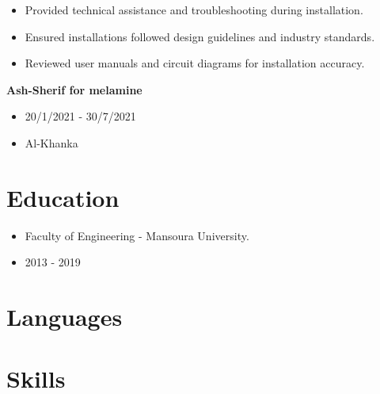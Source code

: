 \documentclass[9pt]{extarticle}
\begin{document}
\begin{paracol}{2}
\begin{expbox}[title = {\bfseries Testing \& Commissioning Engineer}]
\begin{itemize}[nosep,align = left, leftmargin = !, labelwidth = ]
                            \item Provided technical assistance and troubleshooting during installation.
                            \item Ensured installations followed design guidelines and industry standards.
                            \item Reviewed user manuals and circuit diagrams for installation accuracy.
                        	 \end{itemize}
\end{expbox}
\begin{expbox}[title = {\bfseries Junior Maintenance Engineer}]
	 {\bfseries Ash-Sherif for melamine} 
	 \begin{itemize}[nosep,align = left, leftmargin = !, labelwidth = ] 
		 \item[\faCalendar*] 20/1/2021 - 30/7/2021
		 \item[{\faMapMarker*}] Al-Khanka
	 \end{itemize}
\end{expbox}

\section{Education}

\begin{expbox}[title = {\bfseries Bachelor's Degree in Electrical Engineering}]
	\begin{itemize}[nosep,align = left, leftmargin = !, labelwidth = ]\raggedright
		\item[\faUniversity] Faculty of Engineering - Mansoura University.
		\item[\faCalendar*] 2013 - 2019
	\end{itemize}
\end{expbox}


\switchcolumn  
\section{Languages}

\par\medskip
{}

\section{Skills}



\end{paracol}
\end{document}
